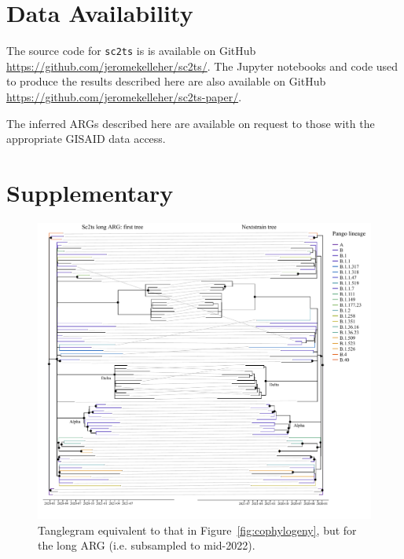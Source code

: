 \documentclass{article}
\begin{document}
\section{Data Availability}
The source code for \texttt{sc2ts} is
is available on GitHub
\url{https://github.com/jeromekelleher/sc2ts/}.
The Jupyter notebooks and code used to produce the results described here are also
available on GitHub \url{https://github.com/jeromekelleher/sc2ts-paper/}.

The inferred ARGs described here are available on request to those with
the appropriate GISAID data access.




\renewcommand\thefigure{S\arabic{figure}}
\setcounter{figure}{0}
\renewcommand\thetable{S\arabic{table}}
\setcounter{table}{0}
\section*{Supplementary}

\begin{figure} \centering
\includegraphics[width=\textwidth]{figures/supp_cophylogeny_long.pdf}
\caption{\label{fig:cophylogeny_long}Tanglegram equivalent to that in Figure~\ref{fig:cophylogeny}, but for the long ARG (i.e. subsampled to mid-2022). }
\end{figure}
\end{document}
